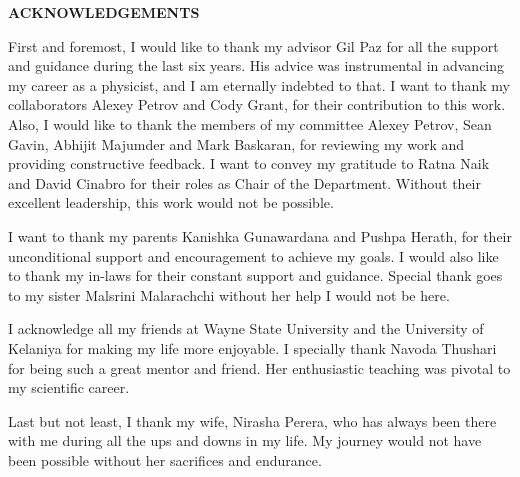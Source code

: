 \newpage
\begin{center}
{\bf ACKNOWLEDGEMENTS}
\end{center}

First and foremost, I would like to thank my advisor Gil Paz for all the support and guidance during the last six years. His advice was instrumental in advancing my career as a physicist, and I am eternally indebted to that. I want to thank my collaborators Alexey Petrov and Cody Grant, for their contribution to this work. Also, I would like to thank the members of my committee Alexey Petrov, Sean Gavin, Abhijit Majumder and Mark Baskaran, for reviewing my work and providing constructive feedback. I want to convey my gratitude to Ratna Naik and David Cinabro for their roles as Chair of the Department. Without their excellent leadership, this work would not be possible.\par 
I want to thank my parents Kanishka Gunawardana and Pushpa Herath, for their unconditional support and encouragement to achieve my goals. I would also like to thank my in-laws for their constant support and guidance. Special thank goes to my sister Malsrini Malarachchi without her help I would not be here.\par  
I acknowledge all my friends at Wayne State University and the University of Kelaniya for making my life more enjoyable. I specially thank Navoda Thushari for being such a great mentor and friend. Her enthusiastic teaching was pivotal to my scientific career.\par  
Last but not least, I thank my wife, Nirasha Perera, who has always been there with me during all the ups and downs in my life. My journey would not have been possible without her sacrifices and endurance.


